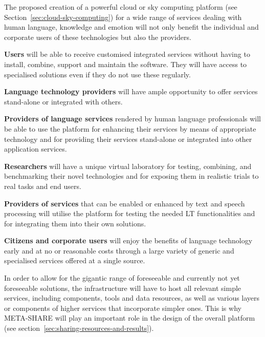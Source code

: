 \documentclass[10pt, plain]{../../metanetpaper}
\begin{document}
\begin{multicols}{2}
The proposed creation of a powerful cloud or sky computing platform (see Section~\ref{sec:cloud-sky-computing}) for a wide range of services dealing with human language, knowledge and emotion will not only benefit the individual and corporate users of these technologies but also the providers.
 
\textbf{Users} will be able to receive customised integrated services without having to install, combine, support and maintain the software. They will have access to specialised solutions even if they do not use these regularly.
 
\textbf{Language technology providers} will have ample opportunity to offer services stand-alone or integrated with others.
 
\textbf{Providers of language services} rendered by human language professionals will be able to use the platform for enhancing their services by means of appropriate technology and for providing their services stand-alone or integrated into other application services.
 
\textbf{Researchers} will have a unique virtual laboratory for testing, combining, and benchmarking their novel technologies and for exposing them in realistic trials to real tasks and end users.
 
\textbf{Providers of services} that can be enabled or enhanced by text and speech processing will utilise the platform for testing the needed LT functionalities and for integrating them into their own solutions.

\textbf{Citizens and corporate users} will enjoy the benefits of language technology early and at no or reasonable costs through a large variety of generic and specialised services offered at a single source.

In order to allow for the gigantic range of foreseeable and currently not yet foreseeable solutions, the infrastructure will have to host all relevant simple services, including components, tools and data resources, as well as various layers or components of higher services that incorporate simpler ones. This is why META-SHARE will play an important role in the design of the overall platform (see section~\ref{sec:sharing-resources-and-results}).
 

\end{multicols}
\end{document}
